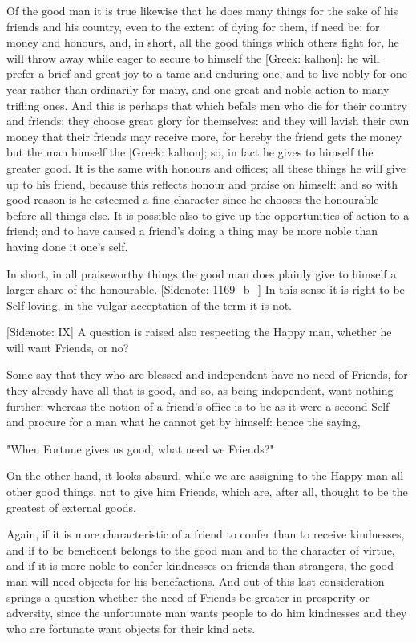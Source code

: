 Of the good man it is true likewise that he does many things for the
sake of his friends and his country, even to the extent of dying for
them, if need be: for money and honours, and, in short, all the good
things which others fight for, he will throw away while eager to secure
to himself the [Greek: kalhon]: he will prefer a brief and great joy
to a tame and enduring one, and to live nobly for one year rather than
ordinarily for many, and one great and noble action to many trifling
ones. And this is perhaps that which befals men who die for their
country and friends; they choose great glory for themselves: and they
will lavish their own money that their friends may receive more, for
hereby the friend gets the money but the man himself the [Greek:
kalhon]; so, in fact he gives to himself the greater good. It is the
same with honours and offices; all these things he will give up to his
friend, because this reflects honour and praise on himself: and so
with good reason is he esteemed a fine character since he chooses the
honourable before all things else. It is possible also to give up the
opportunities of action to a friend; and to have caused a friend's doing
a thing may be more noble than having done it one's self.

In short, in all praiseworthy things the good man does plainly give to
himself a larger share of the honourable. [Sidenote: 1169_b_] In this
sense it is right to be Self-loving, in the vulgar acceptation of the
term it is not.

[Sidenote: IX] A question is raised also respecting the Happy man,
whether he will want Friends, or no?

Some say that they who are blessed and independent have no need of
Friends, for they already have all that is good, and so, as being
independent, want nothing further: whereas the notion of a friend's
office is to be as it were a second Self and procure for a man what he
cannot get by himself: hence the saying,

  "When Fortune gives us good, what need we Friends?"

On the other hand, it looks absurd, while we are assigning to the Happy
man all other good things, not to give him Friends, which are, after
all, thought to be the greatest of external goods.

Again, if it is more characteristic of a friend to confer than to
receive kindnesses, and if to be beneficent belongs to the good man and
to the character of virtue, and if it is more noble to confer kindnesses
on friends than strangers, the good man will need objects for his
benefactions. And out of this last consideration springs a question
whether the need of Friends be greater in prosperity or adversity, since
the unfortunate man wants people to do him kindnesses and they who are
fortunate want objects for their kind acts.

